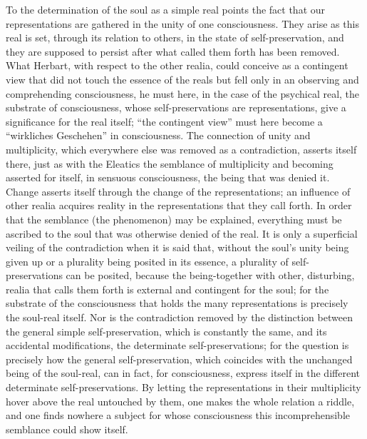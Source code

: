 To the determination of the soul as a simple real points the fact that
our representations are gathered in the unity of one consciousness. They
arise as this real is set, through its relation to others, in the state
of self-preservation, and they are supposed to persist after what called
them forth has been removed. What Herbart, with respect to the other
realia, could conceive as a contingent view that did not touch the
essence of the reals but fell only in an observing and comprehending
consciousness, he must here, in the case of the psychical real, the
substrate of consciousness, whose self-preservations are
representations, give a significance for the real itself; ``the
contingent view'' must here become a ``wirkliches Geschehen'' in
consciousness. The connection of unity and multiplicity, which everywhere
else was removed as a contradiction, asserts itself there, just as with
the Eleatics the semblance of multiplicity and becoming asserted for
itself, in sensuous consciousness, the being that was denied it. Change
asserts itself through the change of the representations; an influence
of other realia acquires reality in the representations that they call
forth. In order that the semblance (the phenomenon) may be explained,
everything must be ascribed to the soul that was otherwise denied of the
real. It is only a superficial veiling of the contradiction when it is
said that, without the soul's unity being given up or a plurality being
posited in its essence, a plurality of self-preservations can be posited,
because the being-together with other, disturbing, realia that calls
them forth is external and contingent for the soul; for the substrate of
the consciousness that holds the many representations is precisely the
soul-real itself. Nor is the contradiction removed by the distinction
between the general simple self-preservation, which is constantly the
same, and its accidental modifications, the determinate
self-preservations; for the question is precisely how the general
self-preservation, which coincides with the unchanged being of the
soul-real, can in fact, for consciousness, express itself in
the different determinate self-preservations. By letting the
representations in their multiplicity hover above the real untouched by
them, one makes the whole relation a riddle, and one finds nowhere a
subject for whose consciousness this incomprehensible semblance could
show itself.


